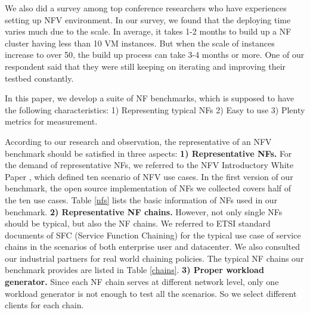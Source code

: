 We also did a survey among top conference researchers who have experiences setting up NFV environment. In our survey, we found that the deploying time varies much due to the scale. In average, it takes 1-2 months to build up a NF cluster having less than 10 VM instances. But when the scale of instances increase to over 50, the build up process can take 3-4 months or more. One of our respondent said that they were still keeping on iterating and improving their testbed constantly.



In this paper, we develop a suite of NF benchmarks, which is supposed to have the following characteristics: 1) Representing typical NFs 2) Easy to use 3) Plenty metrics for measurement.

According to our research and observation,
the representative of an NFV benchmark
should be satisfied in three aspects:
\textbf{1) Representative NFs.}
For the demand of representative NFs,
we referred to the NFV Introductory White Paper \cite{},
which defined ten scenario of NFV use cases.
In the first version of our benchmark,
the open source implementation of NFs we collected
covers half of the ten use cases.
Table \ref{nfs} lists the basic information of NFs used in our benchmark.
\textbf{2) Representative NF chains.}
However, not only single NFs should be typical, but also the NF chains.
We referred to ETSI standard documents of SFC
(Service Function Chaining) \cite{draft-ietf-sfc-dc-use-cases-06}
for the typical use case of service chains
in the scenarios of both enterprise user and datacenter.
We also consulted our industrial partners for real world chaining policies.
The typical NF chains our benchmark provides are listed in Table \ref{chains}.
\textbf{3) Proper workload generator.}
Since each NF chain serves at different network level,
only one workload generator is not enough to test all the scenarios.
So we select different clients for each chain.


